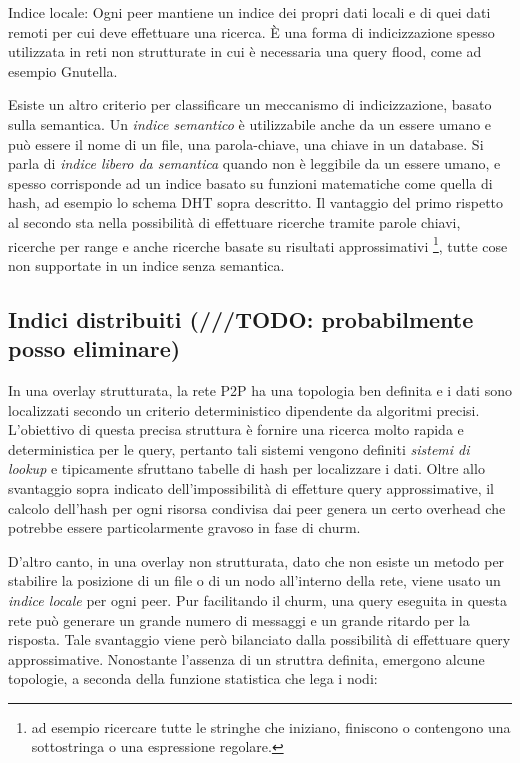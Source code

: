 Indice locale: Ogni peer mantiene un indice dei propri dati locali e di quei dati remoti per cui deve effettuare una ricerca. È una forma di indicizzazione spesso utilizzata in reti non strutturate in cui è necessaria una query flood, come ad esempio Gnutella.

Esiste un altro criterio per classificare un meccanismo di indicizzazione, basato sulla semantica. Un \emph{indice semantico} è utilizzabile anche da un essere umano e può essere il nome di un file, una parola-chiave, una chiave in un database. Si parla di \emph{indice libero da semantica} quando non è leggibile da un essere umano, e spesso corrisponde ad un indice basato su funzioni matematiche come quella di hash, ad esempio lo schema DHT sopra descritto. Il vantaggio del primo rispetto al secondo sta nella possibilità di effettuare ricerche tramite parole chiavi, ricerche per range e anche ricerche basate su risultati approssimativi \footnote{ad esempio ricercare tutte le stringhe che   iniziano, finiscono o contengono una sottostringa o una espressione   regolare.}, tutte cose non supportate in un indice senza semantica.

\subsection{Indici distribuiti (///TODO: probabilmente posso eliminare)}\label{indici-distribuiti-todo-probabilmente-posso-eliminare}

In una overlay strutturata, la rete P2P ha una topologia ben definita e i dati sono localizzati secondo un criterio deterministico dipendente da algoritmi precisi. L'obiettivo di questa precisa struttura è fornire una ricerca molto rapida e deterministica per le query, pertanto tali sistemi vengono definiti \emph{sistemi di lookup} e tipicamente sfruttano tabelle di hash per localizzare i dati. Oltre allo svantaggio sopra indicato dell'impossibilità di effetture query approssimative, il calcolo dell'hash per ogni risorsa condivisa dai peer genera un certo overhead che potrebbe essere particolarmente gravoso in fase di churm.

D'altro canto, in una overlay non strutturata, dato che non esiste un metodo per stabilire la posizione di un file o di un nodo all'interno della rete, viene usato un \emph{indice locale} per ogni peer. Pur facilitando il churm, una query eseguita in questa rete può generare un grande numero di messaggi e un grande ritardo per la risposta. Tale svantaggio viene però bilanciato dalla possibilità di effettuare query approssimative. Nonostante l'assenza di un struttra definita, emergono alcune topologie, a seconda della funzione statistica che lega i nodi:

